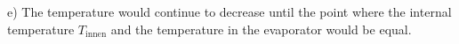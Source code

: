e) The temperature would continue to decrease until the point where the internal temperature \( T_{\text{innen}} \) and the temperature in the evaporator would be equal.